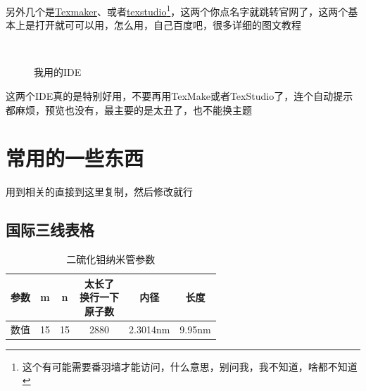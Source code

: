 \documentclass{LZUThesis}
\begin{document}
另外几个是\href{https://www.xm1math.net/texmaker}{Texmaker}、或者\href{http://texstudio.sourceforge.net/}{texstudio}\footnote{这个有可能需要番羽墙才能访问，什么意思，别问我，我不知道，啥都不知道}，这两个你点名字就跳转官网了，这两个基本上是打开就可可以用，怎么用，自己百度吧，很多详细的图文教程


\begin{figure}[H]
	\centering
	\qquad
	\\
    \caption{我用的IDE}
    \label{fig_ide}
\end{figure}

这两个IDE真的是特别好用，不要再用TexMake或者TexStudio了，连个自动提示都麻烦，预览也没有，最主要的是太丑了，也不能换主题



\section{常用的一些东西} %
\label{sec:常用的一些东西}

用到相关的直接到这里复制，然后修改就行

\subsection{国际三线表格} %
\label{sub:国际三线表格}

\begin{table}[H]
    \centering
    \caption{二硫化钼纳米管参数}
    \begin{tabular}{cccccc} %
    \toprule
    参数& m & n & \tabincell{c}{太长了\\换行一下\\原子数}  & 内径 & 长度\\
    \midrule
    数值 & 15 & 15  & 2880 & 2.3014nm & 9.95nm \\
    \bottomrule
    \end{tabular}
    \label{tbl_mos2_nanotube}
\end{table}
\end{document}
